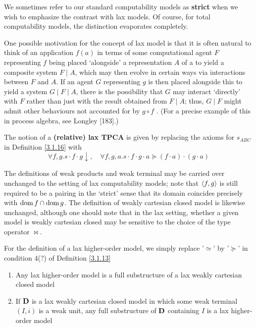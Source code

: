 \documentclass[11pt]{article}
\begin{document}
We sometimes refer to our standard computability models as \textbf{strict} when we wish to emphasize the
contrast with lax models. Of course, for total computability models, the distinction
evaporates completely.

One possible motivation for the concept of lax model is that it is often natural to think of an
application \(f(a)\) in terms of some computational agent \(F\) representing \(f\) being placed ‘alongside’
a representation \(A\) of a to yield a composite system \(F\mid A\), which may then evolve in certain ways
via interactions between \(F\) and \(A\). If an agent \(G\) representing \(g\) is then placed alongside this to
yield a system \(G\mid F\mid A\), there is the possibility that \(G\) may interact ‘directly’ with \(F\) rather
than just with the result obtained from \(F\mid A\); thus, \(G\mid F\) might admit other behaviours not
accounted for by \(g\circ f\) . (For a precise example of this in process algebra, see Longley
[183].)

The notion of a \textbf{(relative) lax TPCA} is given by replacing the axioms for \(s_{ABC}\) in
Definition \ref{3.1.16} with
\begin{equation*}
\forall f,g.s\cdot f\cdot g\downarrow,\quad\forall f,g,a.s\cdot f\cdot g\cdot a\succeq (f\cdot a)\cdot(g\cdot a)
\end{equation*}

The definitions of weak products and weak terminal may be carried over unchanged to the
setting of lax computability models; note that \(\langle f,g\rangle\) is still required to be a pairing in the
‘strict’ sense that its domain coincides precisely with \(\operatorname{dom} f\cap\operatorname{dom} g\). The definition of weakly
cartesian closed model is likewise unchanged, although one should note that in the lax
setting, whether a given model is weakly cartesian closed may be sensitive to the choice of the
type operator \(\bowtie\).

For the definition of a lax higher-order model, we simply replace '\(\simeq\)' by '\(\succeq\)' in
condition 4(?) of Definition \ref{3.1.13}

\begin{theorem}[]
\begin{enumerate}
\item Any lax higher-order model is a full substructure of a lax weakly cartesian closed model
\item If \(\operatorname{\textbf{D}}\) is a lax weakly cartesian closed model in which some weak terminal \((I,i)\) is a
weak unit, any full substructure of \(\operatorname{\textbf{D}}\) containing \(I\) is a lax higher-order model
\end{enumerate}
\end{theorem}
\end{document}
